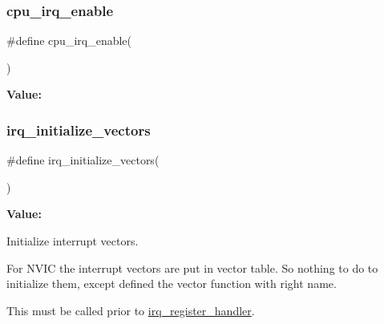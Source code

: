 \subsubsection{\texorpdfstring{cpu\_irq\_enable}{cpu\_irq\_enable}}
{\footnotesize\ttfamily \#define cpu\+\_\+irq\+\_\+enable(\begin{DoxyParamCaption}{ }\end{DoxyParamCaption})}

{\bfseries Value\+:}
\begin{DoxyCode}{0}
\DoxyCodeLine{\textcolor{keywordflow}{do} \{                                       \(\backslash\)}
\DoxyCodeLine{        \textcolor{comment}{/*g\_interrupt\_enabled = true; */}           \(\backslash\)}

\end{DoxyCode}
\mbox{\label{group__interrupt__group_ga931b667f6490ad3d8905fa25bebb24b1}} 
\subsubsection{\texorpdfstring{irq\_initialize\_vectors}{irq\_initialize\_vectors}}
{\footnotesize\ttfamily \#define irq\+\_\+initialize\+\_\+vectors(\begin{DoxyParamCaption}{ }\end{DoxyParamCaption})}

{\bfseries Value\+:}
\begin{DoxyCode}{0}
\DoxyCodeLine{\textcolor{keywordflow}{do} \{                             \(\backslash\)}

\end{DoxyCode}


Initialize interrupt vectors. 

For N\+V\+IC the interrupt vectors are put in vector table. So nothing to do to initialize them, except defined the vector function with right name.

This must be called prior to \mbox{\hyperlink{group__interrupt__group_gaa746642b1132af054826fb169f541965}{irq\+\_\+register\+\_\+handler}}. \mbox{\label{group__interrupt__group_gaa746642b1132af054826fb169f541965}} 
